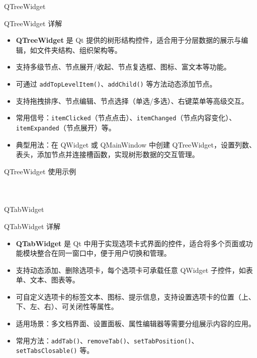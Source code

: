 \documentclass[UTF8,aspectratio=169]{beamer}
\begin{document}
\begin{frame}{QTreeWidget}
    \begin{ytublock}{QTreeWidget 详解}
        \begin{itemize}
            \item \textbf{QTreeWidget} 是 Qt 提供的树形结构控件，适合用于分层数据的展示与编辑，如文件夹结构、组织架构等。
            \item 支持多级节点、节点展开/收起、节点复选框、图标、富文本等功能。
            \item 可通过 \texttt{addTopLevelItem()}、\texttt{addChild()} 等方法动态添加节点。
            \item 支持拖拽排序、节点编辑、节点选择（单选/多选）、右键菜单等高级交互。
            \item 常用信号：\texttt{itemClicked}（节点点击）、\texttt{itemChanged}（节点内容变化）、\texttt{itemExpanded}（节点展开）等。
            \item 典型用法：在 QWidget 或 QMainWindow 中创建 QTreeWidget，设置列数、表头，添加节点并连接槽函数，实现树形数据的交互管理。
        \end{itemize}
    \end{ytublock}
\end{frame}

\begin{frame}[fragile]{QTreeWidget 使用示例}
    \begin{columns}
        \begin{column}{0.48\textwidth}
            \inputminted[firstline=1,lastline=19]{cpp}{code/qt_treewidget_example.cpp}
        \end{column}
        \begin{column}{0.48\textwidth}
            \inputminted[firstline=20,lastline=34]{cpp}{code/qt_treewidget_example.cpp}
        \end{column}
    \end{columns}
\end{frame}

\begin{frame}{QTabWidget}
    \begin{ytublock}{QTabWidget 详解}
        \begin{itemize}
            \item \textbf{QTabWidget} 是 Qt 中用于实现选项卡式界面的控件，适合将多个页面或功能模块整合在同一窗口中，便于用户切换和管理。
            \item 支持动态添加、删除选项卡，每个选项卡可承载任意 QWidget 子控件，如表单、文本、图表等。
            \item 可自定义选项卡的标签文本、图标、提示信息，支持设置选项卡的位置（上、下、左、右）、可关闭性等属性。
            \item 适用场景：多文档界面、设置面板、属性编辑器等需要分组展示内容的应用。
            \item 常用方法：\texttt{addTab()}、\texttt{removeTab()}、\texttt{setTabPosition()}、\texttt{setTabsClosable()} 等。
        \end{itemize}
    \end{ytublock}
\end{frame}
\end{document}
